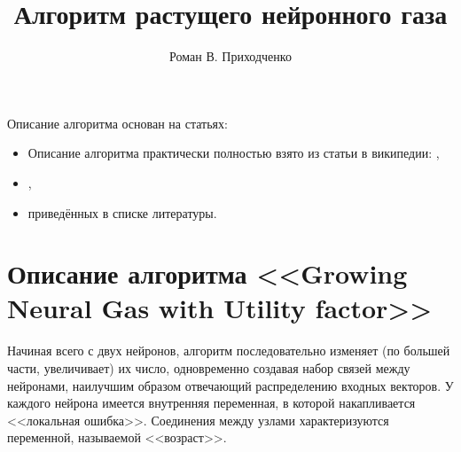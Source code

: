 \documentclass[unicode, 12pt, a4paper,oneside,fleqn]{article}
\author{Роман В. Приходченко}
\title{Алгоритм растущего нейронного газа}
\begin{document}
\renewcommand\bibname{СПИСОК ЛИТЕРАТУРЫ}
\renewcommand\refname{\centering Список литературы}
\renewcommand\contentsname{\centering Содержание}



\makeatletter %
\maketitle

\newpage
\tableofcontents

\newpage
Описание алгоритма основан на статьях:
\begin{itemize}
\item Описание алгоритма практически полностью взято из статьи в
  википедии: \cite[Нейронный газ]{ru.wikipedia.org},
\item \cite[A "Neural-Gas" Network Learns
  Topologies]{neural-gas-T.Martinetz-K.Schulten},
\item \cite[Растущий нейронный газ - реализация на языке
  программирования MQL5]{gng-subbotin} приведённых в списке
  литературы.
\end{itemize}

\section{Описание алгоритма <<Growing Neural Gas with Utility factor>>}
Начиная всего с двух нейронов, алгоритм последовательно изменяет (по
большей части, увеличивает) их число, одновременно создавая набор
связей между нейронами, наилучшим образом отвечающий распределению
входных векторов. У каждого нейрона имеется внутренняя переменная, в
которой накапливается <<локальная ошибка>>. Соединения между узлами
характеризуются переменной, называемой <<возраст>>.
\end{document}
